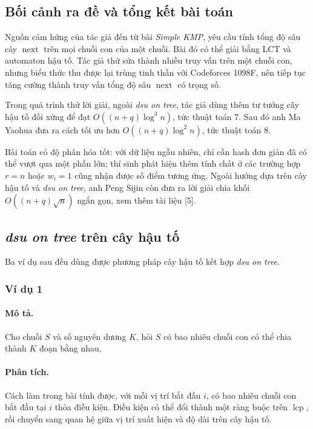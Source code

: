 \documentclass[11pt]{article}
\begin{document}
\subsection{Bối cảnh ra đề và tổng kết bài toán}

Nguồn cảm hứng của tác giả đến từ bài \emph{Simple KMP}, yêu cầu tính tổng độ
sâu cây \(\operatorname{next}\) trên mọi chuỗi con của một chuỗi. Bài đó có thể
giải bằng LCT và automaton hậu tố. Tác giả thử sửa thành nhiều truy vấn trên một
chuỗi con, nhưng biểu thức thu được lại trùng tinh thần với Codeforces 1098F, nên
tiếp tục tăng cường thành truy vấn tổng độ sâu \(\operatorname{next}\) có trọng
số.

Trong quá trình thử lời giải, ngoài \emph{dsu on tree}, tác giả dùng thêm tư
tưởng cây hậu tố đối xứng để đạt $O((n+q)\log^3 n)$, tức thuật toán 7. Sau đó
anh Ma Yaohua đưa ra cách tối ưu hơn $O((n+q)\log^2 n)$, tức thuật toán 8.

Bài toán có độ phân hóa tốt: với dữ liệu ngẫu nhiên, chỉ cần hash đơn giản đã có
thể vượt qua một phần lớn; thí sinh phát hiện thêm tính chất ở các trường hợp
$r=n$ hoặc $w_i=1$ cũng nhận được số điểm tương ứng. Ngoài hướng dựa trên cây hậu
tố và \emph{dsu on tree}, anh Peng Sijin còn đưa ra lời giải chia khối
$O((n+q)\sqrt n)$ ngắn gọn, xem thêm tài liệu [5].

\subsection{\emph{dsu on tree} trên cây hậu tố}

Ba ví dụ sau đều dùng được phương pháp cây hậu tố kết hợp \emph{dsu on tree}.

\subsubsection{Ví dụ 1}

\paragraph{Mô tả.}
Cho chuỗi $S$ và số nguyên dương $K$, hỏi $S$ có bao nhiêu chuỗi con có thể chia
thành $K$ đoạn bằng nhau.

\paragraph{Phân tích.}
Cách làm trong bài tính được, với mỗi vị trí bắt đầu $i$, có bao nhiêu chuỗi con
bắt đầu tại $i$ thỏa điều kiện. Điều kiện có thể đổi thành một ràng buộc trên
$\operatorname{lcp}$, rồi chuyển sang quan hệ giữa vị trí xuất hiện và độ dài
trên cây hậu tố.
\end{document}
